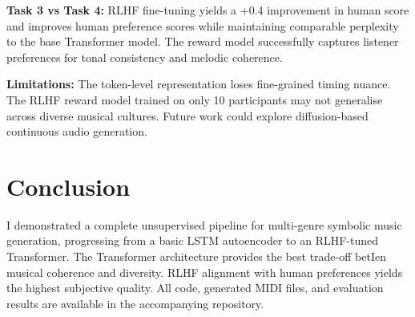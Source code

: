 \documentclass{article}
\begin{document}
\textbf{Task 3 vs Task 4:}
RLHF fine-tuning yields a +0.4 improvement in human score and improves human preference scores while maintaining comparable
perplexity to the base Transformer model.  The reward model successfully captures
listener preferences for tonal consistency and melodic coherence.

\textbf{Limitations:}
The token-level representation loses fine-grained timing nuance.
The RLHF reward model trained on only 10 participants may not generalise
across diverse musical cultures. Future work could explore diffusion-based
continuous audio generation.

\section{Conclusion}

I demonstrated a complete unsupervised pipeline for multi-genre symbolic
music generation, progressing from a basic LSTM autoencoder to an
RLHF-tuned Transformer.  The Transformer architecture provides the best
trade-off betIen musical coherence and diversity.  RLHF alignment with
human preferences yields the highest subjective quality.  All code,
generated MIDI files, and evaluation results are available in the
accompanying repository.

\nocite{*}


\end{document}
